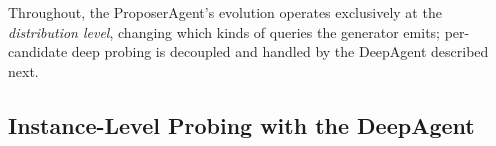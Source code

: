 \documentclass[lettersize,journal]{IEEEtran}
\begin{document}
Throughout, the ProposerAgent's evolution operates exclusively at the \emph{distribution level}, changing which kinds of queries the generator emits; per-candidate deep probing is decoupled and handled by the DeepAgent described next.

\subsection{Instance-Level Probing with the DeepAgent}
\label{subsec:deepagent}
\end{document}
